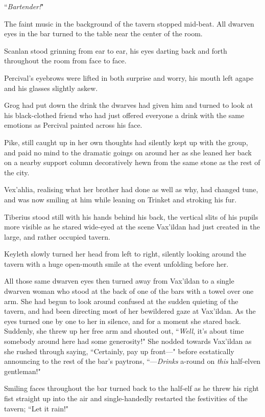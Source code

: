 \begin{center}
    ``\textit{Bartender!}"
\end{center}

The faint music in the background of the tavern stopped mid-beat. All dwarven eyes in the bar turned to the table near the center of the room.

Scanlan stood grinning from ear to ear, his eyes darting back and forth throughout the room from face to face.

Percival's eyebrows were lifted in both surprise and worry, his mouth left agape and his glasses slightly askew.

Grog had put down the drink the dwarves had given him and turned to look at his black-clothed friend who had just offered everyone a drink with the same emotions as Percival painted across his face.

Pike, still caught up in her own thoughts had silently kept up with the group, and paid no mind to the dramatic goings on around her as she leaned her back on a nearby support column decoratively hewn from the same stone as the rest of the city.

Vex'ahlia, realising what her brother had done as well as why, had changed tune, and was now smiling at him while leaning on Trinket and stroking his fur.

Tiberius stood still with his hands behind his back, the vertical slits of his pupils more visible as he stared wide-eyed at the scene Vax'ildan had just created in the large, and rather occupied tavern.

Keyleth slowly turned her head from left to right, silently looking around the tavern with a huge open-mouth smile at the event unfolding before her.

All those same dwarven eyes then turned away from Vax'ildan to a single dwarven woman who stood at the back of one of the bars with a towel over one arm. She had begun to look around confused at the sudden quieting of the tavern, and had been directing most of her bewildered gaze at Vax'ildan. As the eyes turned one by one to her in silence, and for a moment she stared back. Suddenly, she threw up her free arm and shouted out, ``\textit{Well}, it's about time somebody around here had some generosity!" She nodded towards Vax'ildan as she rushed through saying, ``Certainly, pay up front---" before ecstatically announcing to the rest of the bar's paytrons, ``---\textit{Drinks} a-round on \textit{this} half-elven gentleman!"

Smiling faces throughout the bar turned back to the half-elf as he threw his right fist straight up into the air and single-handedly restarted the festivities of the tavern; ``Let it rain!"

